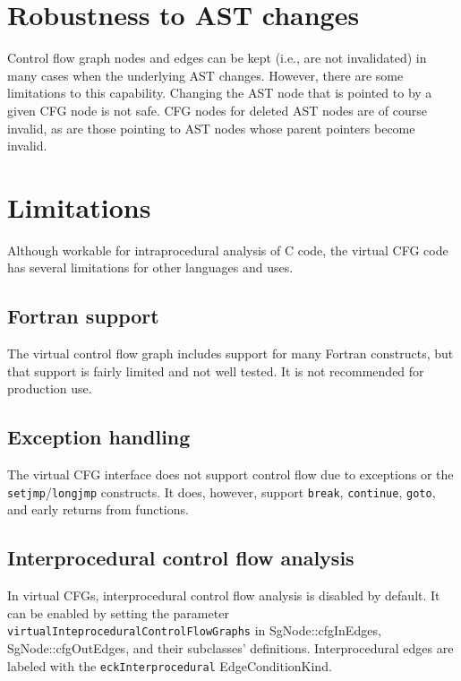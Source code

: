 \section{Robustness to AST changes}

Control flow graph nodes and edges can be kept (i.e., are not invalidated)
in many cases when the underlying AST changes.  However, there are some
limitations to this capability.  Changing the AST node that is pointed to
by a given CFG node is not safe.  CFG nodes for deleted AST nodes are of
course invalid, as are those pointing to AST nodes whose parent pointers
become invalid.

\section{Limitations}

Although workable for intraprocedural analysis of C code, the virtual CFG
code has several limitations for other languages and uses.

\subsection{Fortran support}

The virtual control flow graph includes support for many Fortran
constructs, but that support is fairly limited and not well tested.  It is
not recommended for production use.

\subsection{Exception handling}

The virtual CFG interface does not support control flow due to exceptions
or the \lstinline{setjmp}/\lstinline{longjmp} constructs.
It does, however, support \lstinline{break}, \lstinline{continue},
\lstinline{goto}, and early returns from functions.

\subsection{Interprocedural control flow analysis}

In virtual CFGs, interprocedural control flow analysis is disabled by default. It can be enabled
by setting the parameter \texttt{virtualInteproceduralControlFlowGraphs} in SgNode::cfgInEdges, 
SgNode::cfgOutEdges, and their subclasses' definitions. Interprocedural edges are labeled 
with the \texttt{eckInterprocedural} EdgeConditionKind.

